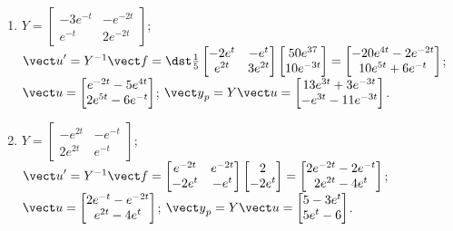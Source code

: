 \documentclass[openany]{book}
\newenvironment{sectionSolutions}{
 \begin{enumerate}[item-label={\thesection.\arabic{enumi}.}]
}{
 \end{enumerate}
}
\begin{document}
\begin{sectionSolutions}
\item
$Y=\begin{bmatrix}
-3e^{-t}&-e^{-2t}\\e^{-t}&2e^{-2t}\end{bmatrix}$;
${\vect u}'=Y^{-1}{\vect f}=
\dst\frac{1}{5}\begin{bmatrix}-2e^t&-e^t
\\e^{2t}&3e^{2t}\end{bmatrix}
\begin{bmatrix}
50e^{37}\\10e^{-3t}
\end{bmatrix}=
\begin{bmatrix}-20e^{4t}-2e^{-2t}\\
10e^{5t}+6e^{-t}\end{bmatrix}$;
${\vect u}=
\begin{bmatrix}e^{-2t}-5e^{4t}\\
2e^{5t}-6e^{-t}\end{bmatrix}$;
${\vect y}_p=Y{\vect u}=
\begin{bmatrix}13e^{3t}+3e^{-3t}\\
-e^{3t}-11e^{-3t}\end{bmatrix}$.




\item
$Y=\begin{bmatrix}
-e^{2t}&-e^{-t}\\2e^{2t}&e^{-t}\end{bmatrix}$;
${\vect u}'=Y^{-1}{\vect f}=
\begin{bmatrix}e^{-2t}&e^{-2t}\\
-2e^t&-e^t\end{bmatrix}
\begin{bmatrix}2\\-2e^t\end{bmatrix}=
\begin{bmatrix}2e^{-2t}-2e^{-t}\\2e^{2t}-4e^t\end{bmatrix}$;
${\vect u}=
\begin{bmatrix}2e^{-t}-e^{-2t}\\
e^{2t}-4e^t\end{bmatrix}$;
${\vect y}_p=Y{\vect u}=
\begin{bmatrix}5-3e^t\\5e^t-6\end{bmatrix}$.



\end{sectionSolutions}
\end{document}
